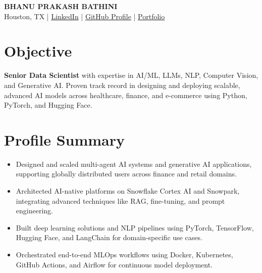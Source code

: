 \documentclass[11pt,letterpaper]{article}
\begin{document}
\begin{center}
  {\Huge\bfseries\color{HEADINGBLUE} BHANU PRAKASH BATHINI}\\[1pt]
  {\normalsize Houston, TX \quad|\quad
   \href{https://www.linkedin.com/}{LinkedIn} \quad|\quad
   \href{https://github.com/}{GitHub Profile} \quad|\quad
   \href{https://portfolio.dev/}{Portfolio}}
\end{center}

\vspace{-8pt}
\section*{Objective}
\vspace{-6pt}

\noindent\textbf{Senior Data Scientist} with expertise in AI/ML, LLMs, NLP, Computer Vision, and Generative AI. Proven track record in designing and deploying scalable, advanced AI models across healthcare, finance, and e-commerce using Python, PyTorch, and Hugging Face.

\vspace{-8pt}
\section*{Profile Summary}
\vspace{-6pt}
\begin{itemize}
  \item Designed and scaled multi-agent AI systems and generative AI applications, supporting globally distributed users across finance and retail domains.
  \item Architected AI-native platforms on Snowflake Cortex AI and Snowpark, integrating advanced techniques like RAG, fine-tuning, and prompt engineering.
  \item Built deep learning solutions and NLP pipelines using PyTorch, TensorFlow, Hugging Face, and LangChain for domain-specific use cases.
  \item Orchestrated end-to-end MLOps workflows using Docker, Kubernetes, GitHub Actions, and Airflow for continuous model deployment.
\end{itemize}
\end{document}
